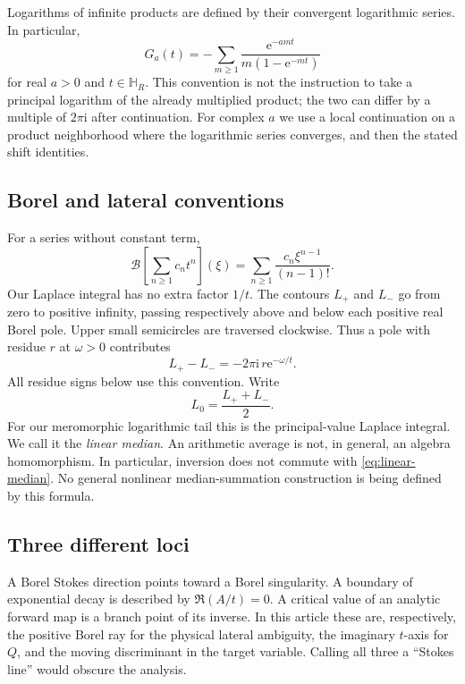 \documentclass[11pt,a4paper]{article}
\numberwithin{equation}{section}
\theoremstyle{definition}
\theoremstyle{remark}
\newcommand{\ii}{\mathrm i}
\newcommand{\e}{\mathrm e}
\newcommand{\B}{\mathcal B}
\begin{document}
Logarithms of infinite products are defined by their convergent logarithmic series. In particular,
\begin{equation}
 G_a(t)=-\sum_{m\geq1}\frac{\e^{-amt}}{m(1-\e^{-mt})}
 \label{eq:G}
\end{equation}
for real $a>0$ and $t\in\mathbb H_R$. This convention is not the instruction to take a principal logarithm of the already multiplied product; the two can differ by a multiple of $2\pi\ii$ after continuation. For complex $a$ we use a local continuation on a product neighborhood where the logarithmic series converges, and then the stated shift identities.

\subsection{Borel and lateral conventions}
For a series without constant term,
\begin{equation}
 \B\left[\sum_{n\geq1}c_nt^n\right](\xi)
 =\sum_{n\geq1}\frac{c_n\xi^{n-1}}{(n-1)!}.
 \label{eq:borel}
\end{equation}
Our Laplace integral has no extra factor $1/t$. The contours $L_+$ and $L_-$ go from zero to positive infinity, passing respectively above and below each positive real Borel pole. Upper small semicircles are traversed clockwise. Thus a pole with residue $r$ at $\omega>0$ contributes
\begin{equation}
 L_+-L_-=-2\pi\ii\,r\e^{-\omega/t}.
 \label{eq:sign}
\end{equation}
All residue signs below use this convention. Write
\begin{equation}
 L_0=\frac{L_++L_-}{2}.
 \label{eq:linear-median}
\end{equation}
For our meromorphic logarithmic tail this is the principal-value Laplace integral. We call it the \emph{linear median}. An arithmetic average is not, in general, an algebra homomorphism. In particular, inversion does not commute with \eqref{eq:linear-median}. No general nonlinear median-summation construction is being defined by this formula.

\subsection{Three different loci}
A Borel Stokes direction points toward a Borel singularity. A boundary of exponential decay is described by $\Re(A/t)=0$. A critical value of an analytic forward map is a branch point of its inverse. In this article these are, respectively, the positive Borel ray for the physical lateral ambiguity, the imaginary $t$-axis for $Q$, and the moving discriminant in the target variable. Calling all three a ``Stokes line'' would obscure the analysis.
\end{document}
